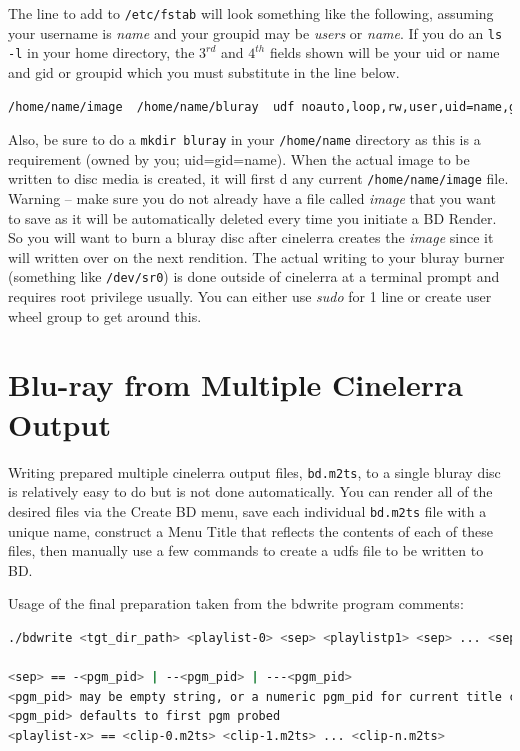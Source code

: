 The line to add to \texttt{/etc/fstab} will look something like the following, assuming your username is \textit{name} and your groupid may be \textit{users} or \textit{name}.  If you do an \texttt{ls -l} in your home directory, the $3^{rd}$ and $4^{th}$ fields shown will be your uid or name and gid or groupid which you must substitute in the line below.

\begin{lstlisting}[language=bash]
/home/name/image  /home/name/bluray  udf noauto,loop,rw,user,uid=name,gid=groupid 0 0
\end{lstlisting}

Also, be sure to do a \texttt{mkdir bluray} in your \texttt{/home/name} directory as this is a requirement (owned by you; uid=gid=name).  When the actual image to be written to disc media is created, it will first d any current \texttt{/home/name/image} file.  Warning – make sure you do not already have a file called \textit{image} that you want to save as it will be automatically deleted every time you initiate a BD Render.  So you will want to burn a bluray disc after cinelerra creates the \textit{image} since it will written over on the next rendition.  The actual writing to your bluray burner (something like \texttt{/dev/sr0}) is done outside of cinelerra at a terminal prompt and requires root privilege usually.  You can either use \textit{sudo} for 1 line or create user wheel group to get around this.

\section{Blu-ray from Multiple Cinelerra Output}%
\label{sec:bluray_multiple_cinelerra_output}

Writing prepared multiple cinelerra output files, \texttt{bd.m2ts}, to a single bluray disc is relatively easy to do but is not done automatically.  You can render all of the desired files via the Create BD menu, save each individual \texttt{bd.m2ts} file with a unique name, construct a Menu Title that reflects the contents of each of these files, then manually use a few commands to create a udfs file to be written to BD.

Usage of the final preparation taken from the bdwrite program comments:

\begin{lstlisting}[language=bash]
./bdwrite <tgt_dir_path> <playlist-0> <sep> <playlistp1> <sep> ... <sep> <playlist-n>

<sep> == -<pgm_pid> | --<pgm_pid> | ---<pgm_pid>
<pgm_pid> may be empty string, or a numeric pgm_pid for current title clip
<pgm_pid> defaults to first pgm probed
<playlist-x> == <clip-0.m2ts> <clip-1.m2ts> ... <clip-n.m2ts>
\end{lstlisting}

